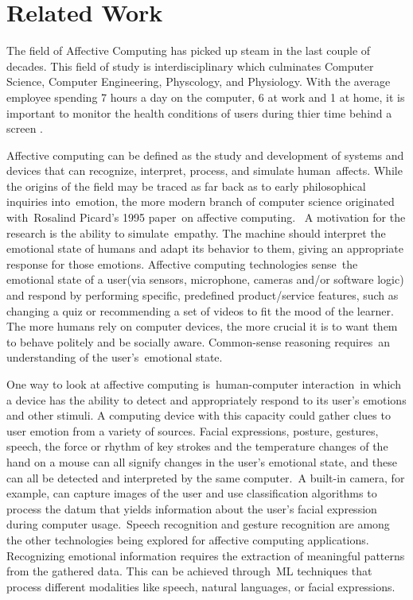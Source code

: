 \section{Related Work}
\label{sec:Related-Work}

The field of Affective Computing has picked up steam in the last couple of decades. 
This field of study is interdisciplinary which culminates Computer Science, Computer Engineering, Physcology, and 
Physiology. With the average employee spending 7 hours a day on the computer, 6 at work and 1 at home, 
it is important to monitor the health conditions of users during thier time behind a screen \cite{computer-time}.

Affective computing can be defined as the study and development of systems and devices that can recognize, interpret, process, and simulate human affects. 
While the origins of the field may be traced as far back as to early philosophical inquiries into emotion, the more modern branch of 
computer science originated with Rosalind Picard's 1995 paper on affective computing.  A motivation for the research is the ability to simulate empathy. 
The machine should interpret the emotional state of humans and adapt its behavior to them, giving an appropriate response for those emotions. 
Affective computing technologies sense the emotional state of a user(via sensors, microphone, cameras and/or software logic) and respond by 
performing specific, predefined product/service features, such as changing a quiz or recommending a set of videos to fit the mood of the learner. 
The more humans rely on computer devices, the more crucial it is to want them to behave politely and be socially aware. Common-sense reasoning 
requires an understanding of the user’s emotional state.

One way to look at affective computing is human-computer interaction in which a device has the ability to detect and appropriately respond 
to its user’s emotions and other stimuli. A computing device with this capacity could gather clues to user emotion from a variety of sources. 
Facial expressions, posture, gestures, speech, the force or rhythm of key strokes and the temperature changes of the hand on a mouse can 
all signify changes in the user’s emotional state, and these can all be detected and interpreted by the same computer. A built-in camera, 
for example, can capture images of the user and use classification algorithms to process the datum that yields information about the user’s 
facial expression during computer usage. Speech recognition and gesture recognition are among the other technologies being explored for affective 
computing applications. Recognizing emotional information requires the extraction of meaningful patterns from the gathered data. 
This can be achieved through ML techniques that process different modalities like speech, natural languages, or facial expressions.

